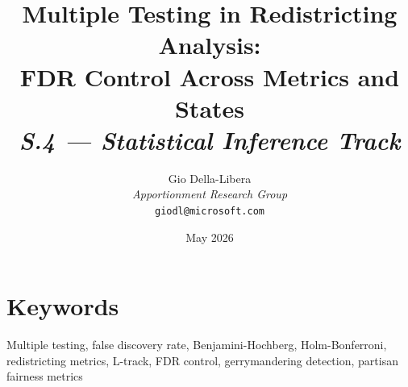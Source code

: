 \documentclass[12pt]{article}
\title{%
  \textbf{Multiple Testing in Redistricting Analysis:\\
  FDR Control Across Metrics and States}\\[0.8em]
  \normalsize\textit{S.4 --- Statistical Inference Track}%
}
\author{%
  Gio Della-Libera\\
  \textit{Apportionment Research Group}\\
  \small\texttt{giodl@microsoft.com}
}
\date{May 2026}
\begin{document}
\maketitle

\begin{abstract}

\end{abstract}

\section*{Keywords}
Multiple testing, false discovery rate, Benjamini-Hochberg, Holm-Bonferroni,
redistricting metrics, L-track, FDR control, gerrymandering detection,
partisan fairness metrics

\tableofcontents
\newpage











\end{document}
